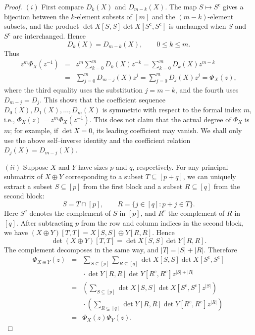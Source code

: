 \documentclass[11pt,a4paper]{article}
\begin{document}
\begin{proof}
$(i)$ First compare $D_k(X)$ and $D_{m-k}(X)$. The map $S\mapsto S^{\mathrm{c}}$ gives a bijection between the $k$-element subsets of $[m]$ and the $(m-k)$-element subsets, and the product $\operatorname{det} X[S,S]\operatorname{det} X[S^{\mathrm{c}},S^{\mathrm{c}}]$ is unchanged when $S$ and $S^{\mathrm{c}}$ are interchanged. Hence
\[
  D_k(X)=D_{m-k}(X),\qquad 0\leq k\leq m.
\]
Thus
\begin{eqnarray*}
  z^m\Phi_X(z^{-1})
  &=&z^m\sum_{k=0}^mD_k(X)z^{-k}
    =\sum_{k=0}^mD_k(X)z^{m-k}\\
  &=&\sum_{j=0}^mD_{m-j}(X)z^j
    =\sum_{j=0}^mD_j(X)z^j
    =\Phi_X(z),
\end{eqnarray*}
where the third equality uses the substitution $j=m-k$, and the fourth uses $D_{m-j}=D_j$. This shows that the coefficient sequence
$D_0(X),D_1(X),\ldots,D_m(X)$ is symmetric with respect to the formal index $m$, i.e.,
$\Phi_X(z)=z^m\Phi_X(z^{-1})$. This does not claim that the actual degree of $\Phi_X$ is $m$; for example, if $\det X=0$, its leading coefficient may vanish. We shall only use the above self–inverse identity and the coefficient relation $D_j(X)=D_{m-j}(X)$.

$(ii)$ Suppose $X$ and $Y$ have sizes $p$ and $q$, respectively. For any principal submatrix of $X\oplus Y$ corresponding to a subset $T\subseteq[p+q]$, we can uniquely extract a subset $S\subseteq[p]$ from the first block and a subset $R\subseteq[q]$ from the second block:
\[
  S=T\cap[p],
  \qquad
  R=\{j\in[q]:p+j\in T\}.
\]
Here $S^{\mathrm{c}}$ denotes the complement of $S$ in $[p]$, and $R^{\mathrm{c}}$ the complement of $R$ in $[q]$. After subtracting $p$ from the row and column indices in the second block, we have
$(X\oplus Y)[T,T]=X[S,S]\oplus Y[R,R]$. Hence
\[
  \det (X\oplus Y)[T,T]
  =\det X[S,S]\det Y[R,R].
\]
The complement decomposes in the same way, and $|T|=|S|+|R|$. Therefore
\begin{eqnarray*}
  \Phi_{X\oplus Y}(z)
  &=&\sum_{S\subseteq[p]}\sum_{R\subseteq[q]}
    \det X[S,S]\det X[S^{\mathrm{c}},S^{\mathrm{c}}]\\
  &&{}\cdot
    \det Y[R,R]\det Y[R^{\mathrm{c}},R^{\mathrm{c}}]
    z^{|S|+|R|}\\
  &=&\left(\sum_{S\subseteq[p]}
    \det X[S,S]\det X[S^{\mathrm{c}},S^{\mathrm{c}}]z^{|S|}\right)\\
  &&{}\cdot
    \left(\sum_{R\subseteq[q]}
    \det Y[R,R]\det Y[R^{\mathrm{c}},R^{\mathrm{c}}]z^{|R|}\right)\\
  &=&\Phi_X(z)\Phi_Y(z).
\end{eqnarray*}


\end{proof}
\end{document}
